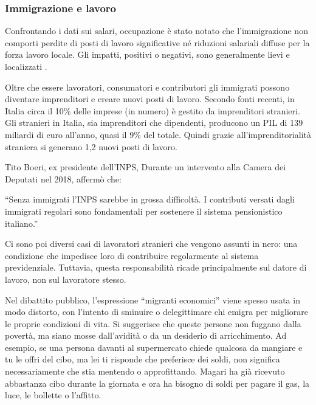 \documentclass[12pt]{book} %
\begin{document}
\subsubsection{Immigrazione e lavoro}
Confrontando i dati sui salari, occupazione è stato notato che l'immigrazione non comporti perdite di posti di lavoro significative né riduzioni salariali diffuse per la forza lavoro locale. Gli impatti, positivi o negativi, sono generalmente lievi e localizzati    .

Oltre che essere lavoratori, consumatori e contributori gli immigrati possono diventare imprenditori e creare nuovi
posti di lavoro.
Secondo fonti recenti, in Italia circa il 10\% delle imprese (in numero) è gestito da imprenditori stranieri.
Gli stranieri in Italia, sia imprenditori che dipendenti, producono un PIL di 139 miliardi di euro all'anno, quasi il 9\% del
totale. Quindi grazie all'imprenditorialità straniera si generano 1,2 nuovi posti di lavoro. 

Tito Boeri, ex presidente dell'INPS, Durante un intervento alla Camera dei Deputati nel 2018, affermò che:

“Senza immigrati l’INPS sarebbe in grossa difficoltà. I contributi versati dagli immigrati regolari sono fondamentali per sostenere il sistema pensionistico italiano.”

Ci sono poi diversi casi di lavoratori stranieri che vengono assunti in nero: una condizione che impedisce loro di contribuire regolarmente al sistema previdenziale. Tuttavia, questa responsabilità ricade principalmente sul datore di lavoro, non sul lavoratore stesso.

Nel dibattito pubblico, l’espressione “migranti economici” viene spesso usata in modo distorto, con l’intento di sminuire o delegittimare chi emigra per migliorare le proprie condizioni di vita. Si suggerisce che queste persone non fuggano dalla povertà, ma siano mosse dall’avidità o da un desiderio di arricchimento.
Ad esempio, se una persona davanti al supermercato chiede qualcosa da mangiare e tu le offri del cibo, ma lei ti risponde che preferisce dei soldi, non significa necessariamente che stia mentendo o approfittando. Magari ha già ricevuto abbastanza cibo durante la giornata e ora ha bisogno di soldi per pagare il gas, la luce, le bollette o l’affitto.
\end{document}
